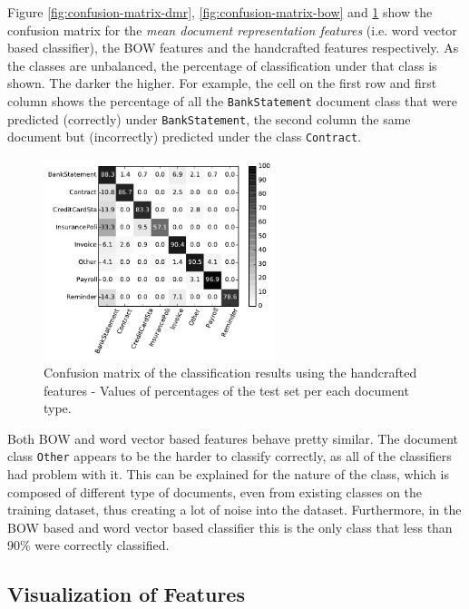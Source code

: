 Figure \ref{fig:confusion-matrix-dmr},  \ref{fig:confusion-matrix-bow} and 
\ref{fig:confusion-matrix-handcrafted} show the confusion matrix for the
\textit{mean document representation features} (i.e. word vector based
classifier),  the \ac{BOW} features  and the handcrafted features
respectively. As the classes are unbalanced, the percentage of classification
under that class is  shown. The darker the higher.  For example, the cell on
the first row and first column shows the percentage of all the
\texttt{BankStatement} document class that were predicted  (correctly) under
\texttt{BankStatement}, the second column the same document but (incorrectly)
 predicted under the class \texttt{Contract}.   


 \begin{figure}[!htpb]
    \centering
    \includegraphics[width=0.6\textwidth]{images/004-xvalidaton-handcrafted.pdf}
    \caption{Confusion matrix of the classification results  using the handcrafted features - Values of percentages of the test set per each document type.}
    \label{fig:confusion-matrix-handcrafted}
\end{figure}

Both \ac{BOW} and word vector based features behave pretty similar. The
document class \texttt{Other} appears  to be the harder to classify
correctly, as all of the classifiers  had problem with it. This can be explained
for the nature of the class, which is composed  of different type of
documents, even from existing classes on the training dataset, thus creating
a lot of noise into the dataset. Furthermore, in the \ac{BOW} based and word
vector based classifier this is the only class that less than 90\% were
correctly classified.

\subsection{Visualization of Features}
\label{sec:sub_w2v4tc_viz_features}

